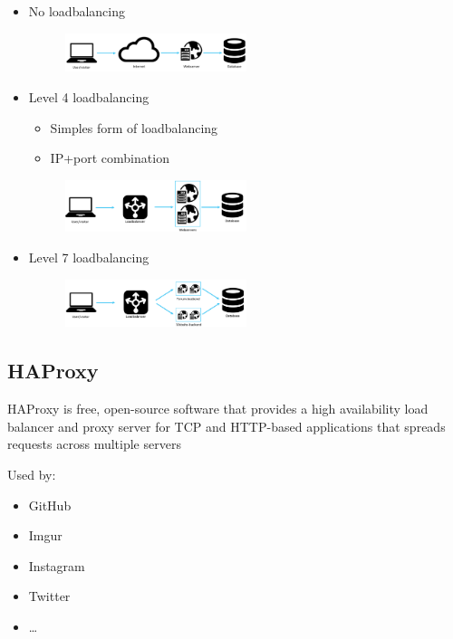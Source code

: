 \documentclass{article}
\begin{document}
\begin{itemize}
    \item No loadbalancing
    \begin{figure}[H]
        \centering
        \includegraphics[width=0.5\textwidth]{loadbalancing1.png}
    \end{figure}
    \item Level 4 loadbalancing
    \begin{itemize}
        \item Simples form of loadbalancing
        \item IP+port combination
    \end{itemize}
    \begin{figure}[H]
        \centering
        \includegraphics[width=0.5\textwidth]{loadbalancing2.png}
    \end{figure}
    \item Level 7 loadbalancing
    \begin{figure}[H]
        \centering
        \includegraphics[width=0.5\textwidth]{loadbalancing3.png}
    \end{figure}
\end{itemize}




\subsection{HAProxy}

HAProxy is free, open-source software that provides a high availability load balancer
and proxy server for TCP and HTTP-based applications that spreads requests across multiple servers

Used by:

\begin{itemize}
    \item GitHub
    \item Imgur
    \item Instagram
    \item Twitter
    \item \dots
\end{itemize}
\end{document}
